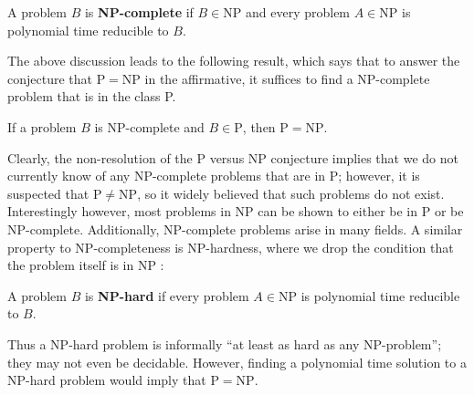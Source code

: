 \begin{definition}\label{def:NP_complete}
    A problem $B$ is \textbf{NP-complete} if $B \in \mathrm{NP}$ and every problem $A \in \mathrm{NP}$ is polynomial time reducible to $B$.
\end{definition}

The above discussion leads to the following result, which says that to answer the conjecture that $\mathrm{P} = \mathrm{NP}$ in the affirmative, it suffices to find a NP-complete problem that is in the class P.

\begin{theorem}\label{thm:NP_complete_P_vs_NP}
    If a problem $B$ is NP-complete and $B \in \mathrm{P}$, then $\mathrm{P} = \mathrm{NP}$. \qedhere
\end{theorem}

Clearly, the non-resolution of the P versus NP conjecture implies that we do not currently know of any NP-complete problems that are in P; however, it is suspected that $\mathrm{P} \neq \mathrm{NP}$, so it widely believed that such problems do not exist. Interestingly however,  most problems in NP can be shown to either be in P or be NP-complete. Additionally, NP-complete problems arise in many fields. A similar property to NP-completeness is NP-hardness, where we drop the condition that the problem itself is in NP :

\begin{definition}\label{def:NP_hard}
    A problem $B$ is \textbf{NP-hard} if every problem $A \in \mathrm{NP}$ is polynomial time reducible to $B$.
\end{definition}

Thus a NP-hard problem is informally ``at least as hard as any NP-problem''; they may not even be decidable. However, finding a polynomial time solution to a NP-hard problem would imply that $\mathrm{P} = \mathrm{NP}$.

